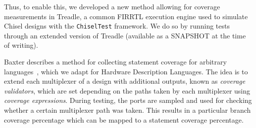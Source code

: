 \documentclass[conference]{IEEEtran}
\newcommand{\martin}[1]{{\color{blue} Martin: #1}}
\begin{document}
Thus, to enable this, we developed a new method allowing for coverage measurements in Treadle, a common FIRRTL execution engine used to simulate Chisel designs with the \texttt{ChiselTest} framework. We do so by running tests through an extended version of Treadle (available as a SNAPSHOT at the time of writing).%


Baxter describes a method for collecting statement coverage for arbitrary languages~\cite{branch-cov-made-easy:2002}, which we adapt for Hardware Description Languages. 
The idea is to extend each multiplexer of a design with additional outputs, known as \textit{coverage validators}, which are set depending on the paths taken by each multiplexer using \textit{coverage expressions}.
During testing, the ports are sampled and used for checking whether a certain multiplexer path was taken.
This results in a particular branch coverage percentage which can be mapped to a statement coverage percentage.
\end{document}
